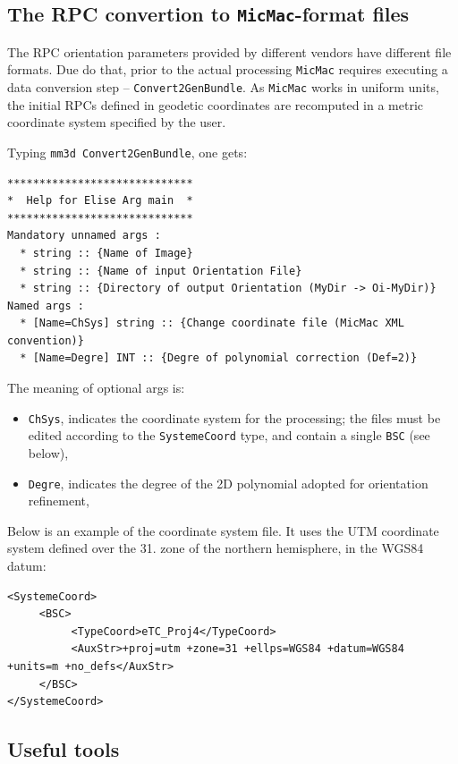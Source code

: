 \subsection{ The RPC convertion to {\tt MicMac}-format files}\label{subsec:rpcConv}
The RPC orientation parameters provided by different vendors have different file formats. Due do that, prior to the actual processing {\tt MicMac} requires executing a data conversion step -- {\tt Convert2GenBundle}. As {\tt MicMac} works in uniform units, the initial RPCs defined in geodetic coordinates are recomputed in a metric coordinate system specified by the user.

\vspace{\baselineskip}
Typing {\tt mm3d Convert2GenBundle}, one gets:

\begin{verbatim}
*****************************
*  Help for Elise Arg main  *
*****************************
Mandatory unnamed args : 
  * string :: {Name of Image}
  * string :: {Name of input Orientation File}
  * string :: {Directory of output Orientation (MyDir -> Oi-MyDir)}
Named args : 
  * [Name=ChSys] string :: {Change coordinate file (MicMac XML convention)}
  * [Name=Degre] INT :: {Degre of polynomial correction (Def=2)}
\end{verbatim}

The meaning of optional args is:

\begin{itemize}
   \item {\tt ChSys}, indicates the coordinate system for the processing; the files must be edited according to the {\tt SystemeCoord} type, and contain a single {\tt BSC} (see below),
   \item {\tt Degre}, indicates the degree of the 2D polynomial adopted for orientation refinement,
\end{itemize}

Below is an example of the coordinate system file. It uses the UTM coordinate system defined over the 31. zone of the northern hemisphere, in the WGS84 datum:

\begin{verbatim}
<SystemeCoord>
     <BSC>
          <TypeCoord>eTC_Proj4</TypeCoord>
          <AuxStr>+proj=utm +zone=31 +ellps=WGS84 +datum=WGS84 +units=m +no_defs</AuxStr>
     </BSC>
</SystemeCoord>
\end{verbatim}
 
\subsection{Useful tools}

